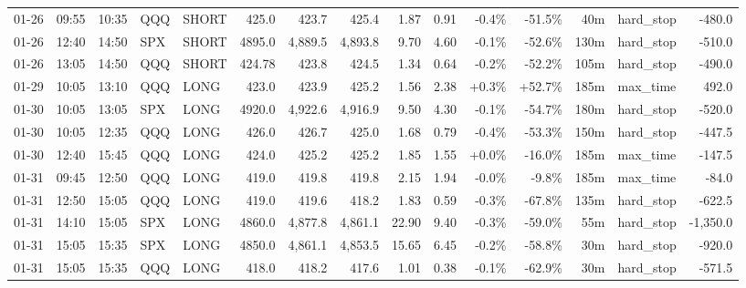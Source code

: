 \documentclass[11pt,a4paper,twoside]{article}
\begin{document}
\begin{landscape}
\begin{center}
\begin{longtable}{>{\color{txtmain}}l l l l l r r r r r r r r >{\color{txtmain}}l r}
01-26 & 09:55 & 10:35 & QQQ & SHORT & 425.0 & 423.7 & 425.4 & 1.87 & 0.91 & \textcolor{lossred}{-0.4\%} & \textcolor{lossred}{-51.5\%} & 40m & hard\_stop & \textcolor{lossred}{-480.0} \\
01-26 & 12:40 & 14:50 & SPX & SHORT & 4895.0 & 4,889.5 & 4,893.8 & 9.70 & 4.60 & \textcolor{lossred}{-0.1\%} & \textcolor{lossred}{-52.6\%} & 130m & hard\_stop & \textcolor{lossred}{-510.0} \\
01-26 & 13:05 & 14:50 & QQQ & SHORT & 424.78 & 423.8 & 424.5 & 1.34 & 0.64 & \textcolor{lossred}{-0.2\%} & \textcolor{lossred}{-52.2\%} & 105m & hard\_stop & \textcolor{lossred}{-490.0} \\
01-29 & 10:05 & 13:10 & QQQ & LONG & 423.0 & 423.9 & 425.2 & 1.56 & 2.38 & \textcolor{wingreen}{+0.3\%} & \textcolor{wingreen}{+52.7\%} & 185m & max\_time & \textcolor{wingreen}{492.0} \\
01-30 & 10:05 & 13:05 & SPX & LONG & 4920.0 & 4,922.6 & 4,916.9 & 9.50 & 4.30 & \textcolor{lossred}{-0.1\%} & \textcolor{lossred}{-54.7\%} & 180m & hard\_stop & \textcolor{lossred}{-520.0} \\
01-30 & 10:05 & 12:35 & QQQ & LONG & 426.0 & 426.7 & 425.0 & 1.68 & 0.79 & \textcolor{lossred}{-0.4\%} & \textcolor{lossred}{-53.3\%} & 150m & hard\_stop & \textcolor{lossred}{-447.5} \\
01-30 & 12:40 & 15:45 & QQQ & LONG & 424.0 & 425.2 & 425.2 & 1.85 & 1.55 & \textcolor{wingreen}{+0.0\%} & \textcolor{lossred}{-16.0\%} & 185m & max\_time & \textcolor{lossred}{-147.5} \\
01-31 & 09:45 & 12:50 & QQQ & LONG & 419.0 & 419.8 & 419.8 & 2.15 & 1.94 & \textcolor{lossred}{-0.0\%} & \textcolor{lossred}{-9.8\%} & 185m & max\_time & \textcolor{lossred}{-84.0} \\
01-31 & 12:50 & 15:05 & QQQ & LONG & 419.0 & 419.6 & 418.2 & 1.83 & 0.59 & \textcolor{lossred}{-0.3\%} & \textcolor{lossred}{-67.8\%} & 135m & hard\_stop & \textcolor{lossred}{-622.5} \\
01-31 & 14:10 & 15:05 & SPX & LONG & 4860.0 & 4,877.8 & 4,861.1 & 22.90 & 9.40 & \textcolor{lossred}{-0.3\%} & \textcolor{lossred}{-59.0\%} & 55m & hard\_stop & \textcolor{lossred}{-1,350.0} \\
01-31 & 15:05 & 15:35 & SPX & LONG & 4850.0 & 4,861.1 & 4,853.5 & 15.65 & 6.45 & \textcolor{lossred}{-0.2\%} & \textcolor{lossred}{-58.8\%} & 30m & hard\_stop & \textcolor{lossred}{-920.0} \\
01-31 & 15:05 & 15:35 & QQQ & LONG & 418.0 & 418.2 & 417.6 & 1.01 & 0.38 & \textcolor{lossred}{-0.1\%} & \textcolor{lossred}{-62.9\%} & 30m & hard\_stop & \textcolor{lossred}{-571.5} \\

\end{longtable}
\end{center}
\end{landscape}
\end{document}
